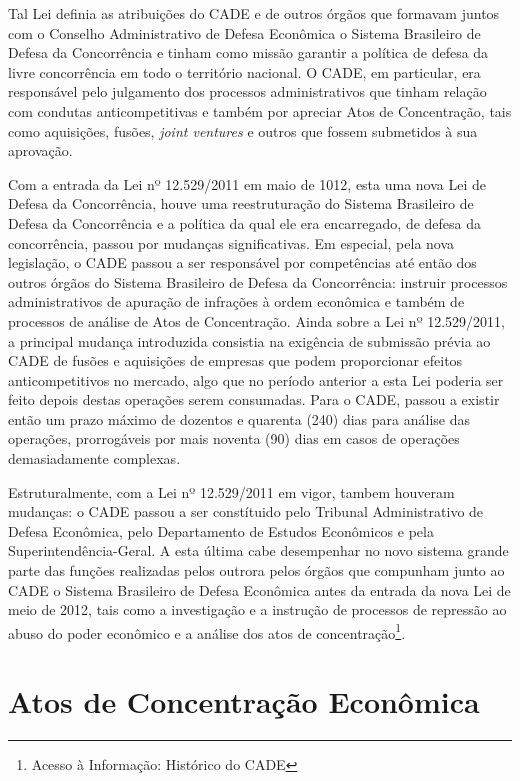 \documentclass[11pt]{report}
\begin{document}
Tal Lei definia as atribuições do CADE e de outros órgãos que formavam juntos com o Conselho Administrativo de Defesa Econômica o Sistema Brasileiro de Defesa da Concorrência e tinham
como missão garantir a política de defesa da livre concorrência em todo o território nacional. O CADE, em particular, era responsável pelo julgamento dos processos administrativos
que tinham relação com condutas anticompetitivas e também por apreciar Atos de Concentração, tais como aquisições, fusões, \textit{joint ventures} e outros que fossem submetidos
à sua aprovação.

Com a entrada da Lei nº 12.529/2011 em maio de 1012, esta uma nova Lei de Defesa da Concorrência, houve uma reestruturação do Sistema Brasileiro de Defesa da Concorrência e a política
da qual ele era encarregado, de defesa da concorrência, passou por mudanças significativas. Em especial, pela nova legislação, o CADE passou a ser responsável por competências até
então dos outros órgãos do Sistema Brasileiro de Defesa da Concorrência: instruir processos administrativos de apuração de infrações à ordem econômica e também de processos de análise
de Atos de Concentração. Ainda sobre a Lei nº 12.529/2011, a principal mudança introduzida consistia na exigência de submissão
prévia ao CADE de fusões e aquisições de empresas que podem proporcionar efeitos anticompetitivos no mercado, algo que no período anterior a esta Lei poderia ser feito depois destas
operações serem consumadas. Para o CADE, passou a existir então um prazo máximo de dozentos e quarenta (240) dias para análise das operações, prorrogáveis por mais noventa (90) dias
em casos de operações demasiadamente complexas.

Estruturalmente, com a Lei nº 12.529/2011 em vigor, tambem houveram mudanças: o CADE passou a ser constítuido pelo Tribunal Administrativo de Defesa Econômica, pelo Departamento de
Estudos Econômicos e pela Superintendência-Geral. A esta última cabe desempenhar no novo sistema grande parte das funções realizadas pelos outrora pelos órgãos que compunham junto
ao CADE o Sistema Brasileiro de Defesa Econômica antes da entrada da nova Lei de meio de 2012, tais como a investigação e a instrução de processos de repressão ao abuso do poder
econômico e a análise dos atos de concentração\footnote[3]{Acesso à Informação: Histórico do CADE}.

\section{Atos de Concentração Econômica}
\end{document}
